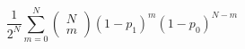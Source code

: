   \begin{equation}
    \frac{1}{2^N}\sum_{m=0}^N\left(\begin{array}{c}N\\m\end{array}\right)\left(1-p_1\right)^m\left(1-p_0\right)^{N-m}
    \label{eq:wtdErr}
  \end{equation}
